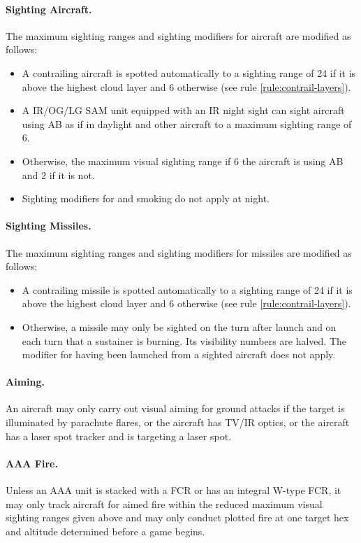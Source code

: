 \begin{advancedrules}
{\paragraph{Sighting Aircraft.} The maximum sighting ranges and sighting modifiers for aircraft are modified as follows:
\begin{itemize}
\item 
A contrailing aircraft is spotted automatically to a sighting range of 24 if it is above the highest cloud layer and 6 otherwise (see rule \ref{rule:contrail-layers}). 
\item
A IR/OG/LG SAM unit equipped with an IR night sight can sight aircraft using AB as if in daylight and other aircraft to a maximum sighting range of 6.
\item
Otherwise, the maximum visual sighting range if 6 the aircraft is using AB and 2 if it is not. 
\item
Sighting modifiers for  and smoking do not apply at night.
\end{itemize}

\paragraph{Sighting Missiles.} The maximum sighting ranges and sighting modifiers for missiles are modified as follows:
\begin{itemize}
\item 
A contrailing missile is spotted automatically to a sighting range of 24 if it is above the highest cloud layer and 6 otherwise (see rule \ref{rule:contrail-layers}). 
\item
Otherwise, a missile may only be sighted on the turn after launch and on each turn that a sustainer is burning. Its visibility numbers are halved. The modifier for having been launched from a sighted aircraft does not apply.
\end{itemize}

\paragraph{Aiming.} An aircraft may only carry out visual aiming for ground attacks if the target is illuminated by parachute flares, or the aircraft has TV/IR optics, or the aircraft has a laser spot tracker and is targeting a laser spot.

\paragraph{AAA Fire.} Unless an AAA unit is stacked with a FCR or has an integral W-type FCR, it may only track aircraft for aimed fire within the reduced maximum visual sighting ranges given above and may only conduct plotted fire at one target hex and altitude determined before a game begins.

}
\end{advancedrules}
